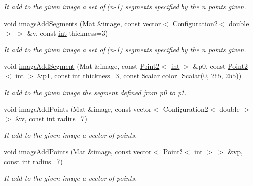 \begin{DoxyCompactItemize}
\begin{DoxyCompactList}\small\item\em It add to the given image a set of (n-\/1) segments specified by the n points given. \end{DoxyCompactList}\item 
void \mbox{\hyperlink{class_mapp_aa518a6c77c040566082813ca16cfddcf}{image\+Add\+Segments}} (Mat \&image, const vector$<$ \mbox{\hyperlink{class_configuration2}{Configuration2}}$<$ double $>$ $>$ \&v, const \mbox{\hyperlink{draw_8hh_aa620a13339ac3a1177c86edc549fda9b}{int}} thickness=3)
\begin{DoxyCompactList}\small\item\em It add to the given image a set of (n-\/1) segments specified by the n points given. \end{DoxyCompactList}\item 
void \mbox{\hyperlink{class_mapp_ac5106fd8a795763d2007246f9debf1a2}{image\+Add\+Segment}} (Mat \&image, const \mbox{\hyperlink{class_point2}{Point2}}$<$ \mbox{\hyperlink{draw_8hh_aa620a13339ac3a1177c86edc549fda9b}{int}} $>$ \&p0, const \mbox{\hyperlink{class_point2}{Point2}}$<$ \mbox{\hyperlink{draw_8hh_aa620a13339ac3a1177c86edc549fda9b}{int}} $>$ \&p1, const \mbox{\hyperlink{draw_8hh_aa620a13339ac3a1177c86edc549fda9b}{int}} thickness=3, const Scalar color=Scalar(0, 255, 255))
\begin{DoxyCompactList}\small\item\em It add to the given image the segment defined from p0 to p1. \end{DoxyCompactList}\item 
void \mbox{\hyperlink{class_mapp_aa3c785e9861bbb6204bbd44467ac2ef8}{image\+Add\+Points}} (Mat \&image, const vector$<$ \mbox{\hyperlink{class_configuration2}{Configuration2}}$<$ double $>$ $>$ \&v, const \mbox{\hyperlink{draw_8hh_aa620a13339ac3a1177c86edc549fda9b}{int}} radius=7)
\begin{DoxyCompactList}\small\item\em It add to the given image a vector of points. \end{DoxyCompactList}\item 
void \mbox{\hyperlink{class_mapp_a1029eed72b4607bb9be933c124a82ab6}{image\+Add\+Points}} (Mat \&image, const vector$<$ \mbox{\hyperlink{class_point2}{Point2}}$<$ \mbox{\hyperlink{draw_8hh_aa620a13339ac3a1177c86edc549fda9b}{int}} $>$ $>$ \&vp, const \mbox{\hyperlink{draw_8hh_aa620a13339ac3a1177c86edc549fda9b}{int}} radius=7)
\begin{DoxyCompactList}\small\item\em It add to the given image a vector of points. \end{DoxyCompactList}\item 

\end{DoxyCompactItemize}
